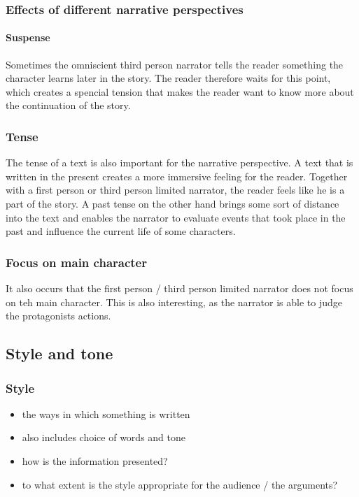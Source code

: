 \documentclass{article}
\begin{document}
	\subsubsection{Effects of different narrative perspectives}

	\paragraph{Suspense}
	Sometimes the omniscient third person narrator tells the reader something the character learns later in the story. The reader therefore waits for this point, which creates a spencial tension that makes the reader want to know more about the continuation of the story.

	\subsubsection{Tense}
	The tense of a text is also important for the narrative perspective. A text that is written in the present creates a more immersive feeling for the reader. Together with a first person or third person limited narrator, the reader feels like he is a part of the story.
	A past tense on the other hand brings some sort of distance into the text and enables the narrator to evaluate events that took place in the past and influence the current life of some characters.

	\subsubsection{Focus on main character}
	It also occurs that the first person / third person limited narrator does not focus on teh main character. This is also interesting, as the narrator is able to judge the protagonists actions.

	\subsection{Style and tone}

	\subsubsection{Style}
	\begin{itemize}
		\item the ways in which something is written
		\item also includes choice of words and tone
		\item how is the information presented?
		\item to what extent is the style appropriate for the audience / the arguments?
	\end{itemize}
\end{document}
